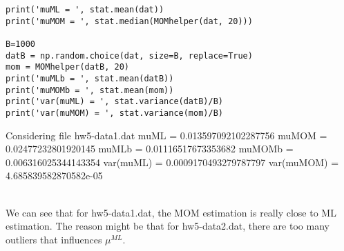 \documentclass[preprint,12pt]{elsarticle}
\begin{document}
\begin{enumerate}[label=\alph*]
\begin{lstlisting}
print('muML = ', stat.mean(dat))
print('muMOM = ', stat.median(MOMhelper(dat, 20)))

B=1000
datB = np.random.choice(dat, size=B, replace=True)
mom = MOMhelper(datB, 20)
print('muMLb = ', stat.mean(datB))
print('muMOMb = ', stat.mean(mom))
print('var(muML) = ', stat.variance(datB)/B)
print('var(muMOM) = ', stat.variance(mom)/B)
        \end{lstlisting}
        \begin{spverbatim}
Considering file hw5-data1.dat
muML =  0.013597092102287756
muMOM =  0.02477232801920145
muMLb =  0.01116517673353682
muMOMb =  0.006316025344143354
var(muML) =  0.0009170493279787797
var(muMOM) =  4.685839582870582e-05
        \end{spverbatim}
        \\ We can see that for hw5-data1.dat, the MOM estimation is really
        close to ML estimation. The reason might be that for hw5-data2.dat,
        there are too many outliers that influences $\mu^{ML}$.

    \end{enumerate}
\end{document}
